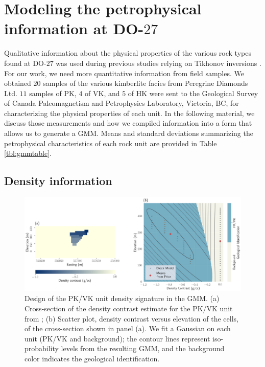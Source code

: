 \documentclass[paper, twocolumn]{geophysics} %
\begin{document}
\section{Modeling the petrophysical information at DO-$27$}

Qualitative information about the physical properties of the various rock types found at DO-$27$ was used during previous studies relying on Tikhonov inversions \citep{TKCpaper,TKCEM,TKCIP}. For our work, we need more quantitative information from field samples. We obtained $20$ samples of the various kimberlite facies from Peregrine Diamonds Ltd. $11$ samples of PK, $4$ of VK, and $5$ of HK were sent to the Geological Survey of Canada Paleomagnetism and Petrophysics Laboratory, Victoria, BC, for characterizing the physical properties of each unit. In the following material, we discuss those measurements and how we compiled information into a form that allows us to generate a GMM. Means and standard deviations summarizing the petrophysical characteristics of each rock unit are provided in Table \ref{tbl:gmmtable}.

\subsection{Density information} \label{pkvkdensitysection}

\begin{figure}%
\centering
\includegraphics[width=\textwidth]{Figures/300dpi/Figure7.png}
\caption{Design of the PK/VK unit density signature in the GMM. (a) Cross-section of the density contrast estimate for the PK/VK unit from \citet{TechnicalReport}; (b) Scatter plot, density contrast versus elevation of the cells, of the cross-section shown in panel (a). We fit a Gaussian on each unit (PK/VK and background); the contour lines represent iso-probability levels from the resulting GMM, and the background color indicates the geological identification.}
\label{fig:Figure7.png}
\end{figure}%
\end{document}
